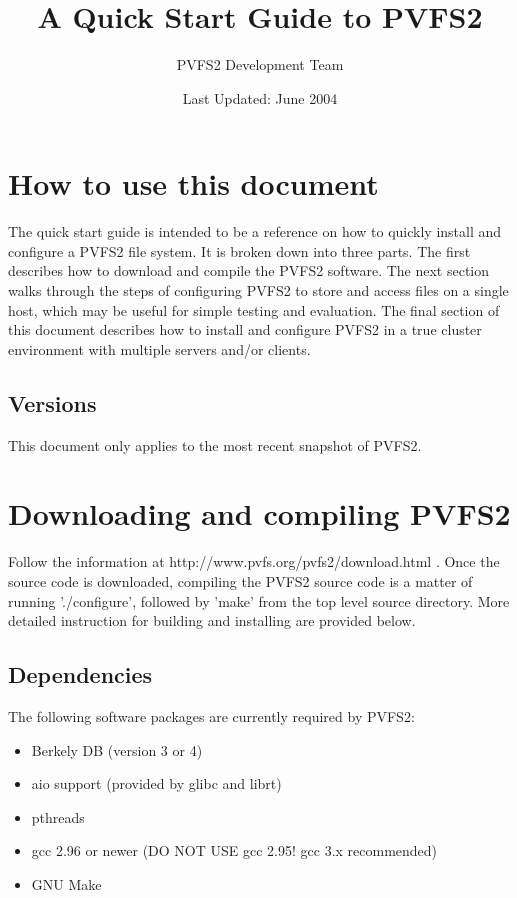 \documentclass[11pt, letterpaper]{article}
\title{A Quick Start Guide to PVFS2}
\author{ PVFS2 Development Team }
\date{Last Updated: June 2004}
\begin{document}
\maketitle

\tableofcontents

\newpage

\thispagestyle{empty}

\section{How to use this document}
\label{sec:howto}

The quick start guide is intended to be a reference on how to quickly
install and configure a PVFS2 file system.  It is broken down into
three parts.  The first describes how to download and compile the
PVFS2 software.  The next section walks through the steps of
configuring PVFS2 to store and access files on a single host, which
may be useful for simple testing and evaluation.  The final section of
this document describes how to install and configure PVFS2 in a true
cluster environment with multiple servers and/or clients.

\subsection{Versions}

This document only applies to the most recent snapshot of PVFS2.

\section{Downloading and compiling PVFS2}

Follow the information at http://www.pvfs.org/pvfs2/download.html .
Once the source code is downloaded,
compiling the PVFS2 source code is a matter of running './configure',
followed by 'make' from the top level source directory.  More detailed
instruction for building and installing are provided below.

\subsection{Dependencies}

The following software packages are currently required by PVFS2:
\begin{itemize}
\item Berkely DB (version 3 or 4)
\item aio support (provided by glibc and librt)
\item pthreads
\item gcc 2.96 or newer (DO NOT USE gcc 2.95! gcc 3.x recommended)
\item GNU Make
\end{itemize}
\end{document}

